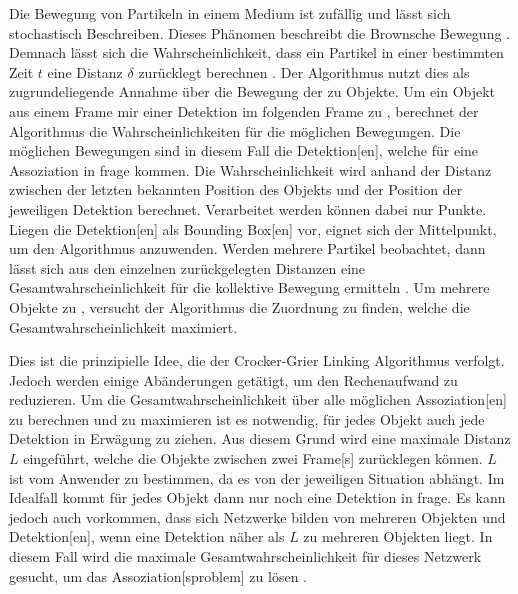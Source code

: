 Die Bewegung von Partikeln in einem Medium ist zufällig und lässt sich stochastisch Beschreiben. Dieses Phänomen beschreibt die \gls{Brownsche Bewegung} \cite{Nelson.1972}. Demnach lässt sich die Wahrscheinlichkeit, dass ein Partikel in einer bestimmten Zeit \(t\) eine Distanz \(\delta\) zurücklegt berechnen \cite{Crocker.1996} . Der Algorithmus nutzt dies als zugrundeliegende Annahme über die Bewegung der zu  Objekte. Um ein Objekt aus einem \gls{Frame} mir einer \gls{Detektion} im folgenden \gls{Frame} zu , berechnet der Algorithmus die Wahrscheinlichkeiten für die möglichen Bewegungen. Die möglichen Bewegungen sind in diesem Fall die \gls{Detektion}[en], welche für eine \gls{Assoziation} in frage kommen. Die Wahrscheinlichkeit wird anhand der Distanz zwischen der letzten bekannten Position des Objekts und der Position der jeweiligen \gls{Detektion} berechnet. Verarbeitet werden können dabei nur Punkte. Liegen die \gls{Detektion}[en] als \gls{Bounding Box}[en] vor, eignet sich der Mittelpunkt, um den Algorithmus anzuwenden. Werden mehrere Partikel beobachtet, dann lässt sich aus den einzelnen zurückgelegten Distanzen eine Gesamtwahrscheinlichkeit für die kollektive Bewegung ermitteln \cite{Crocker.1996} . Um mehrere Objekte zu , versucht der Algorithmus die Zuordnung zu finden, welche die Gesamtwahrscheinlichkeit maximiert. \par

Dies ist die prinzipielle Idee, die der Crocker-Grier Linking Algorithmus verfolgt. Jedoch werden einige Abänderungen getätigt, um den Rechenaufwand zu reduzieren. Um die Gesamtwahrscheinlichkeit über alle möglichen \gls{Assoziation}[en] zu berechnen und zu maximieren ist es notwendig, für jedes Objekt auch jede \gls{Detektion} in Erwägung zu ziehen. Aus diesem Grund wird eine maximale Distanz \(L\) eingeführt, welche die Objekte zwischen zwei \gls{Frame}[s] zurücklegen können. \(L\) ist vom Anwender zu bestimmen, da es von der jeweiligen Situation abhängt. Im Idealfall kommt für jedes Objekt dann nur noch eine \gls{Detektion} in frage. Es kann jedoch auch vorkommen, dass sich Netzwerke bilden von mehreren Objekten und \gls{Detektion}[en], wenn eine \gls{Detektion} näher als \(L\) zu mehreren Objekten liegt. In diesem Fall wird die maximale Gesamtwahrscheinlichkeit für dieses Netzwerk gesucht, um das \gls{Assoziation}[sproblem] zu lösen \cite{Crocker.1996}. \par

